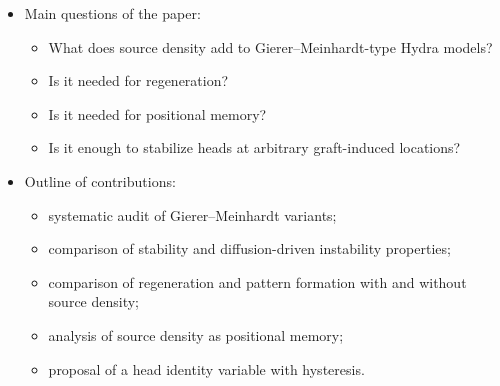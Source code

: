 \begin{itemize}
    \item Main questions of the paper:
    \begin{itemize}
        \item What does source density add to Gierer--Meinhardt-type Hydra models?
        \item Is it needed for regeneration?
        \item Is it needed for positional memory?
        \item Is it enough to stabilize heads at arbitrary graft-induced locations?
    \end{itemize}
    \item Outline of contributions:
    \begin{itemize}
        \item systematic audit of Gierer--Meinhardt variants;
        \item comparison of stability and diffusion-driven instability properties;
        \item comparison of regeneration and pattern formation with and without source density;
        \item analysis of source density as positional memory;
        \item proposal of a head identity variable with hysteresis.
    \end{itemize}
\end{itemize}
